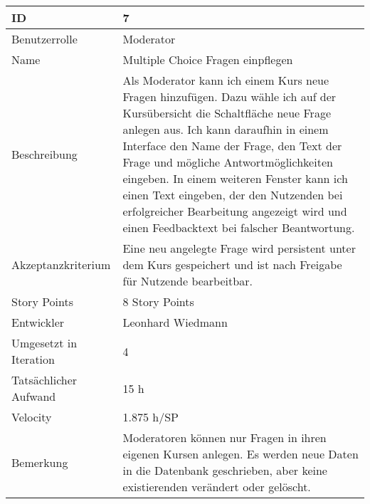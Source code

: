 \begin{tabularx}{\textwidth}{|p{}|X|}
	\hline
	ID & 7\\
	\hline
	Benutzerrolle & Moderator\\
	\hline
	Name & Multiple Choice Fragen einpflegen\\
	\hline
	Beschreibung & Als Moderator kann ich einem Kurs neue Fragen hinzufügen. Dazu wähle ich auf der Kursübersicht die Schaltfläche neue Frage anlegen aus. Ich kann daraufhin in einem Interface den Name der Frage, den Text der Frage und mögliche Antwortmöglichkeiten eingeben. In einem weiteren Fenster kann ich einen Text eingeben, der den Nutzenden bei erfolgreicher Bearbeitung angezeigt wird und einen Feedbacktext bei falscher Beantwortung.\\
	\hline
	Akzeptanzkriterium & Eine neu angelegte Frage wird persistent unter dem Kurs gespeichert und ist nach Freigabe für Nutzende bearbeitbar.\\
	\hline
	Story Points & 8 Story Points\\
	\hline
	Entwickler & Leonhard Wiedmann\\
	\hline
	Umgesetzt in Iteration & 4\\
	\hline
	Tatsächlicher Aufwand & 15 h\\
	\hline
	Velocity & 1.875 h/SP\\
	\hline
	Bemerkung & Moderatoren können nur Fragen in ihren eigenen Kursen anlegen. Es werden neue Daten in die Datenbank geschrieben, aber keine existierenden verändert oder gelöscht.\\
	\hline
\end{tabularx}
\vspace{20pt}
